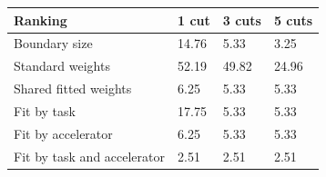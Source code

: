 \begin{tabular}{@{}llll@{}}
\toprule
Ranking & 1 cut & 3 cuts & 5 cuts \\
\midrule
Boundary size & 14.76 & 5.33 & 3.25 \\
Standard weights & 52.19 & 49.82 & 24.96 \\
Shared fitted weights & 6.25 & 5.33 & 5.33 \\
Fit by task & 17.75 & 5.33 & 5.33 \\
Fit by accelerator & 6.25 & 5.33 & 5.33 \\
Fit by task and accelerator & 2.51 & 2.51 & 2.51 \\
\bottomrule
\end{tabular}

